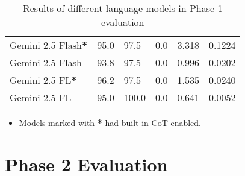 \begin{table}[H]
\begin{tabularx}{\textwidth}{Xp{2.5cm}p{2.2cm}p{1.5cm}p{1.8cm}p{2cm}}
        \rowcolor[gray]{0.9}
        Gemini 2.5 Flash\textbf{*}  & 95.0                                  & 97.5                                  & 0.0                        & 3.318                         & 0.1224                           \\
        Gemini 2.5 Flash            & 93.8                                  & 97.5                                  & 0.0                        & 0.996                         & 0.0202                           \\
        \rowcolor[gray]{0.9}
        Gemini 2.5 FL\textbf{*}     & 96.2                                  & 97.5                                  & 0.0                        & 1.535                         & 0.0240                           \\
        Gemini 2.5 FL               & 95.0                                  & 100.0                                 & 0.0                        & 0.641                         & 0.0052                           \\
        \bottomrule
    \end{tabularx}

    \begin{itemize}
        \footnotesize
        \item Models marked with \textbf{*} had built-in CoT enabled.
    \end{itemize}
    \caption{Results of different language models in Phase 1 evaluation}
    \label{tab:phase1_results}
\end{table}

\section{Phase 2 Evaluation}

